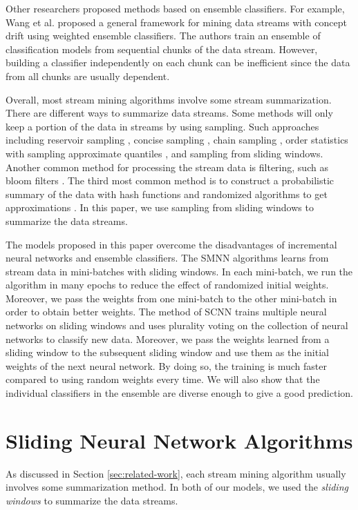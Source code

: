 \documentclass[conference]{IEEEtran}
\begin{document}
		Other researchers proposed methods based on ensemble classifiers. For example, Wang et al.\cite{ensemble1} proposed a general framework for mining data streams with concept drift using weighted ensemble classifiers. The authors train an ensemble of classification models from sequential chunks of the data stream. However, building a classifier independently on each chunk can be inefficient since the data from all chunks are usually dependent. 
		
		Overall, most stream mining algorithms involve some stream summarization. There are different ways to summarize data streams. Some methods will only keep a portion of the data in streams by using sampling. Such approaches including reservoir sampling \cite{vitter}, concise sampling \cite{Gibbons}, chain sampling \cite{Babcock}, order statistics with sampling approximate quantiles \cite{Manku}, and sampling from sliding windows. Another common method for processing the stream data is filtering, such as bloom filters \cite{filter}. The third most common method is to construct a probabilistic summary of the data with hash functions and randomized algorithms to get approximations \cite{filter}. In this paper, we use sampling from sliding windows to summarize the data streams.
		
		
		The models proposed in this paper overcome the disadvantages of incremental neural networks and ensemble classifiers.  The SMNN algorithms learns from stream data in mini-batches with sliding windows. In each mini-batch, we run the algorithm in many epochs to reduce the effect of randomized initial weights. Moreover, we pass the weights from one mini-batch to the other mini-batch in order to obtain better weights. The method of SCNN trains multiple neural networks on sliding windows and uses plurality voting on the collection of neural networks to classify new data. Moreover, we pass the weights learned from a sliding window to the subsequent sliding window and use them as the initial weights of the next neural network. By doing so, the training  is much faster compared to using random weights every time. We will also show that the individual classifiers in the ensemble are diverse enough to give a good prediction. 
		
		\section{Sliding Neural Network Algorithms} 
		\label{sec:models}
		As discussed in Section \ref{sec:related-work}, each stream mining algorithm usually involves some summarization method. In both of our models,  we used the \emph{sliding windows} to summarize the data streams.
		
\end{document}
